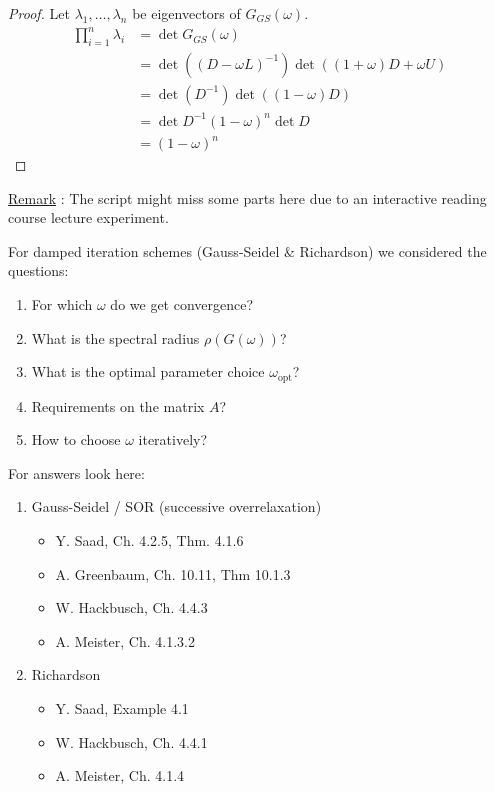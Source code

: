 \begin{proof}
\label{thm:theorem2.5proof}
Let $\lambda _{1}, \ldots , \lambda _{n}$ be eigenvectors of $G_{GS}(\omega )$.
\begin{align*}
	\prod_{i=1}^{n} \lambda _{i} &= \det G_{GS}(\omega ) \\
								 &= \det ((D-\omega L)^{-1}) \det ((1+\omega ) D+ \omega U) \\
								 &= \det (D^{-1}) \det((1-\omega )D) \\
								 &= \det D^{-1} (1-\omega )^{n} \det D \\
								 &= (1-\omega )^{n}
\end{align*}

\end{proof}

\begin{mdframed}
	\underline{Remark}  : The script might miss some parts here due to an interactive reading course lecture experiment.

	For damped iteration schemes (Gauss-Seidel \& Richardson) we considered the questions:
	\begin{enumerate}[label=(\arabic{enumi})]
		\item For which $\omega $ do we get convergence?
		\item What is the spectral radius $\rho(G(\omega ))$?
		\item What is the optimal parameter choice $\omega _{\text{opt}}$?
		\item Requirements on the matrix $A$?
		\item How to choose $\omega $ iteratively?
	\end{enumerate}
	For answers look here:
	\begin{enumerate}[label=(\alph{enumi})]
		\item Gauss-Seidel / SOR (successive overrelaxation)
			\begin{itemize}
				\item Y. Saad, Ch. 4.2.5, Thm. 4.1.6
				\item A. Greenbaum, Ch. 10.11, Thm 10.1.3
				\item W. Hackbusch, Ch. 4.4.3
				\item A. Meister, Ch. 4.1.3.2
			\end{itemize}
		\item Richardson
			\begin{itemize}
				\item Y. Saad, Example 4.1
				\item W. Hackbusch, Ch. 4.4.1
				\item A. Meister, Ch. 4.1.4
			\end{itemize}
	\end{enumerate}
\end{mdframed}

